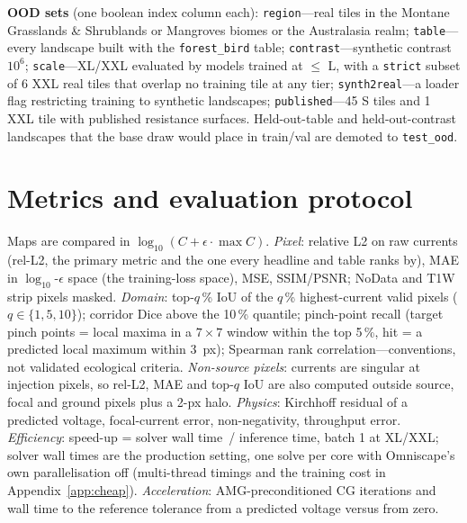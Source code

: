 \documentclass{article}
\newcommand{\relltwo}{rel-L2}
\newcommand{\code}[1]{\texttt{#1}}
\begin{document}
\textbf{OOD sets} (one boolean index column each): \code{region}---real tiles in the Montane Grasslands \& Shrublands or Mangroves biomes or the Australasia realm; \code{table}---every landscape built with the \code{forest\_bird} table; \code{contrast}---synthetic contrast $10^6$; \code{scale}---XL/XXL evaluated by models trained at $\le$ L, with a \code{strict} subset of 6 XXL real tiles that overlap no training tile at any tier; \code{synth2real}---a loader flag restricting training to synthetic landscapes; \code{published}---45 S tiles and 1 XXL tile with published resistance surfaces. Held-out-table and held-out-contrast landscapes that the base draw would place in train/val are demoted to \code{test\_ood}.

\section{Metrics and evaluation protocol}
\label{sec:metrics}

Maps are compared in $\log_{10}(C+\epsilon\cdot\max C)$. \emph{Pixel}: relative L2 on raw currents (\relltwo{}, the primary metric and the one every headline and table ranks by), MAE in $\log_{10}$-$\epsilon$ space (the training-loss space), MSE, SSIM/PSNR; NoData and T1W strip pixels masked. \emph{Domain}: top-$q$\,\% IoU of the $q$\,\% highest-current valid pixels ($q\in\{1,5,10\}$); corridor Dice above the 10\,\% quantile; pinch-point recall (target pinch points = local maxima in a $7\times 7$ window within the top 5\,\%, hit = a predicted local maximum within 3~px); Spearman rank correlation---conventions, not validated ecological criteria. \emph{Non-source pixels}: currents are singular at injection pixels, so \relltwo{}, MAE and top-$q$ IoU are also computed outside source, focal and ground pixels plus a 2-px halo. \emph{Physics}: Kirchhoff residual of a predicted voltage, focal-current error, non-negativity, throughput error. \emph{Efficiency}: speed-up = solver wall time~/ inference time, batch 1 at XL/XXL; solver wall times are the production setting, one solve per core with Omniscape's own parallelisation off (multi-thread timings and the training cost in Appendix~\ref{app:cheap}). \emph{Acceleration}: AMG-preconditioned CG iterations and wall time to the reference tolerance from a predicted voltage versus from zero.
\end{document}
